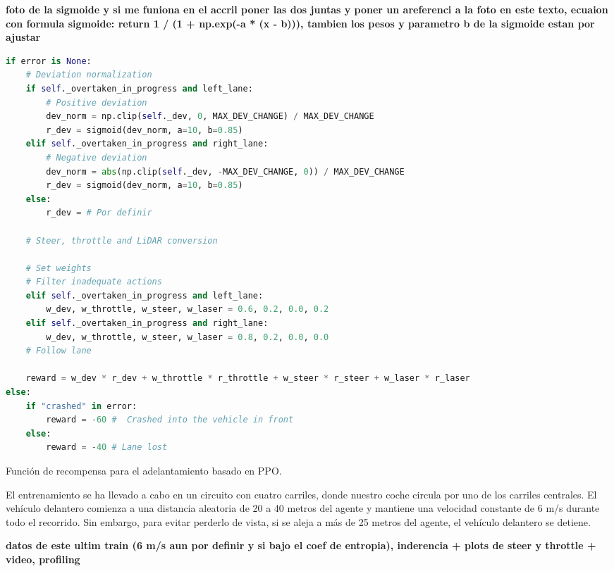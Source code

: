 \textbf{foto de la sigmoide y si me funiona en el accril poner las dos juntas y poner un areferenci a la foto en este texto, ecuaion con formula sigmoide: return 1 / (1 + np.exp(-a * (x - b))), tambien los pesos y parametro b de la sigmoide estan por ajustar}

\begin{code}[h]
\begin{lstlisting}[language=Python]
if error is None:
    # Deviation normalization
    if self._overtaken_in_progress and left_lane:
        # Positive deviation
        dev_norm = np.clip(self._dev, 0, MAX_DEV_CHANGE) / MAX_DEV_CHANGE
        r_dev = sigmoid(dev_norm, a=10, b=0.85)
    elif self._overtaken_in_progress and right_lane:
        # Negative deviation 
        dev_norm = abs(np.clip(self._dev, -MAX_DEV_CHANGE, 0)) / MAX_DEV_CHANGE
        r_dev = sigmoid(dev_norm, a=10, b=0.85)
    else:
        r_dev = # Por definir

    # Steer, throttle and LiDAR conversion

    # Set weights
    # Filter inadequate actions
    elif self._overtaken_in_progress and left_lane:
        w_dev, w_throttle, w_steer, w_laser = 0.6, 0.2, 0.0, 0.2
    elif self._overtaken_in_progress and right_lane:
        w_dev, w_throttle, w_steer, w_laser = 0.8, 0.2, 0.0, 0.0  
    # Follow lane

    reward = w_dev * r_dev + w_throttle * r_throttle + w_steer * r_steer + w_laser * r_laser
else:
    if "crashed" in error:
        reward = -60 #  Crashed into the vehicle in front
    else:
        reward = -40 # Lane lost
\end{lstlisting}
\caption[Función de recompensa para el adelantamiento basado en \ac{PPO}]{Función de recompensa para el adelantamiento basado en \ac{PPO}.}
\label{cod:rew_ppo_overtaken}
\end{code}

El entrenamiento se ha llevado a cabo en un circuito con cuatro carriles, donde nuestro coche circula por uno de los carriles centrales. El vehículo delantero comienza a una distancia aleatoria de 20 a 40 metros del agente y mantiene una velocidad constante de 6 m/s durante todo el recorrido. Sin embargo, para evitar perderlo de vista, si se aleja a más de 25 metros del agente, el vehículo delantero se detiene.

\textbf{datos de este ultim train (6 m/s aun por definir y si bajo el coef de entropia), inderencia + plots de steer y throttle + video, profiling}